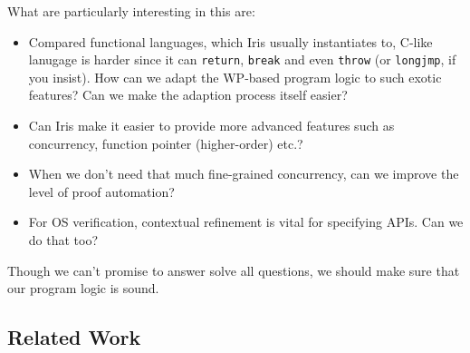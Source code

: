 What are particularly interesting in this are:

\begin{itemize}
\item Compared functional languages, which Iris usually instantiates to, C-like lanugage is harder since
      it can \texttt{return}, \texttt{break} and even \texttt{throw} (or \texttt{longjmp}, if you insist).
      How can we adapt the WP-based program logic to such exotic features? Can we make the adaption process
      itself easier?
\item Can Iris make it easier to provide more advanced features such as
      concurrency, function pointer (higher-order) etc.?
\item When we don't need that much fine-grained concurrency, can we improve the level of
      proof automation?
\item For OS verification, contextual refinement is vital for specifying APIs. Can we do that too?
\end{itemize}

Though we can't promise to answer solve all questions, we should make sure that our program logic is sound.

\subsection{Related Work}

